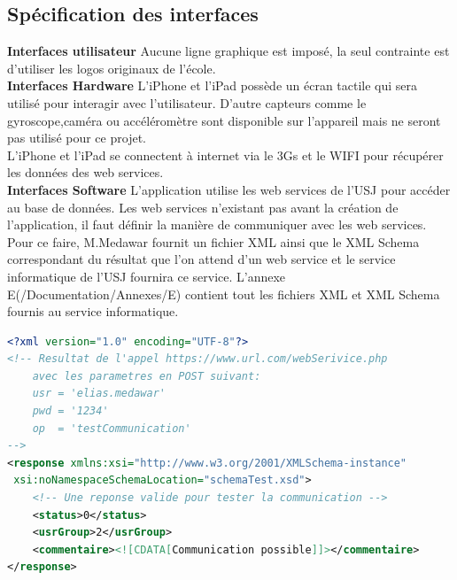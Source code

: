 	\subsection{Spécification des interfaces}
		\textbf{Interfaces utilisateur}  
			Aucune ligne graphique est imposé, la seul contrainte est d'utiliser les logos originaux de l'école.\\[0.2cm]
		\textbf{Interfaces Hardware} 
			L'iPhone et l'iPad possède un écran tactile qui sera utilisé pour interagir avec l'utilisateur. D'autre capteurs comme le gyroscope,caméra ou accéléromètre sont disponible sur l'appareil mais ne seront pas utilisé pour ce projet. \\
			L'iPhone et l'iPad se connectent à internet via le 3Gs et le WIFI pour récupérer les données des web services.\\[0.2cm]
	 	\textbf{Interfaces Software} 
			L'application utilise les web services de l'\gls{USJ} pour accéder au base de données. Les web services n'existant pas avant la création de l'application, il faut définir la manière de communiquer avec les web services. Pour ce faire, M.Medawar fournit un fichier XML ainsi que le XML Schema correspondant du résultat que l'on attend d'un web service et le service informatique de l'USJ fournira ce service.  L'annexe E(/Documentation/Annexes/E) contient tout les fichiers XML et XML Schema fournis au service informatique. \\
			  \begin{lstlisting}[language=XML,caption = Exemple de code XML fournit au service informatique de l'USJ]
<?xml version="1.0" encoding="UTF-8"?>
<!-- Resultat de l'appel https://www.url.com/webSerivice.php 
    avec les parametres en POST suivant:
    usr = 'elias.medawar'
    pwd = '1234'
    op  = 'testCommunication'
-->
<response xmlns:xsi="http://www.w3.org/2001/XMLSchema-instance"
 xsi:noNamespaceSchemaLocation="schemaTest.xsd">
    <!-- Une reponse valide pour tester la communication -->
    <status>0</status>
    <usrGroup>2</usrGroup>
    <commentaire><![CDATA[Communication possible]]></commentaire>
</response>
			\end{lstlisting}

